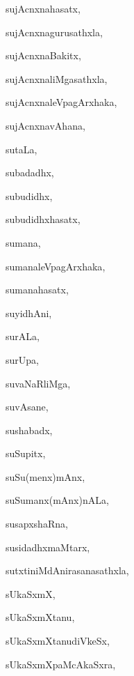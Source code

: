 \begin{multicols}{3}
{\noindent
{sujAcnxnahasatx}, \pageref{sujAcnxnahasatx}

\noindent
{sujAcnxnagurusathxla}, \pageref{sujAcnxnagurusathxla}

\noindent
{sujAcnxnaBakitx}, \pageref{sujAcnxnaBakitx}

\noindent
{sujAcnxnaliMgasathxla}, \pageref{sujAcnxnaliMgasathxla}

\noindent
{sujAcnxnaleVpagArxhaka}, \pageref{sujAcnxnaleVpagArxhaka}

\noindent
{sujAcnxnavAhana}, \pageref{sujAcnxnavAhana}

\noindent
{sutaLa}, \pageref{sutaLa}

\noindent
{subadadhx}, \pageref{subadadhx}

\noindent
{subudidhx}, \pageref{subudidhx}

\noindent
{subudidhxhasatx}, \pageref{subudidhxhasatx}

\noindent
{sumana}, \pageref{sumana}

\noindent
{sumanaleVpagArxhaka}, \pageref{sumanaleVpagArxhaka}

\noindent
{sumanahasatx}, \pageref{sumanahasatx}

\noindent
{suyidhAni}, \pageref{suyidhAni}

\noindent
{surALa}, \pageref{surALa}

\noindent
{surUpa}, \pageref{surUpa}

\noindent
{suvaNaRliMga}, \pageref{suvaNaRliMga}

\noindent
{suvAsane}, \pageref{suvAsane}

\noindent
{sushabadx}, \pageref{sushabadx}

\noindent
{suSupitx}, \pageref{suSupitx}

\noindent
{suSu(menx)mAnx}, \pageref{suSumenxmAnx}

\noindent
{suSumanx(mAnx)nALa}, \pageref{suSumanxmAnxnALa}

\noindent
{susapxshaRna}, \pageref{susapxshaRna}

\noindent
{susidadhxmaMtarx}, \pageref{susidadhxmaMtarx}

\noindent
{sutxtiniMdAnirasanasathxla}, \pageref{sutxtiniMdAnirasanasathxla}

\noindent
{sUkaSxmX}, \pageref{sUkaSxmX}

\noindent
{sUkaSxmXtanu}, \pageref{sUkaSxmXtanu}

\noindent
{sUkaSxmXtanudiVkeSx}, \pageref{sUkaSxmXtanudiVkeSx}

\noindent
{sUkaSxmXpaMcAkaSxra}, \pageref{sUkaSxmXpaMcAkaSxra}

}
\end{multicols}
